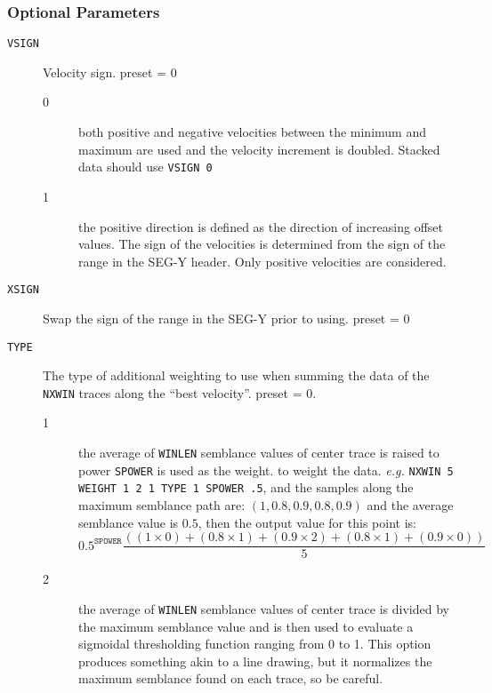 \subsubsection{Optional Parameters}

\begin{description}
    \item[\texttt{VSIGN}] Velocity sign.  \Gls{preset} = 0
\begin{description}
        \item[0] both positive and negative velocities between the minimum
         and maximum are used and the velocity increment is doubled.
         Stacked data should use \texttt{VSIGN 0}
     \item[1] the positive direction is defined as the direction of
         increasing offset values.  The sign of the velocities is
         determined from the sign of the range in the SEG-Y header.
         Only positive velocities are considered.
\end{description}

\item[\texttt{XSIGN}] Swap the sign of the range in the SEG-Y prior to using.  \Gls{preset} = 0

\item[\texttt{TYPE}] The type of additional weighting to use when summing the data of the \texttt{NXWIN} traces along the ``best velocity''.  \Gls{preset} = 0.
\begin{description}
    \item[1] the average of \texttt{WINLEN} semblance values of center trace is
         raised to power \texttt{SPOWER} is used as the weight.
         to weight the data.
         \textit{e.g.}  \texttt{NXWIN 5 WEIGHT 1 2 1  TYPE 1 SPOWER .5},
         and the samples along the maximum semblance path are:
         $(1, 0.8, 0.9, 0.8, 0.9)$ and the average semblance value is $0.5$,
         then the output value for this point is:
         \begin{equation}
             0.5^{\texttt{SPOWER}} \dfrac{\left((1 \times 0) + (0.8 \times 1) + (0.9 \times 2) + (0.8 \times 1) + (0.9 \times 0)\right)}{5}
         \end{equation}
     \item[2] the average of \texttt{WINLEN} semblance values of center trace is
         divided by the maximum semblance value and is then used to
         evaluate a sigmoidal thresholding function ranging from 0 to 1.
         This option produces something akin to a line drawing, but it
         normalizes the maximum semblance found on each trace, so be
         careful.
\end{description}


\end{description}
